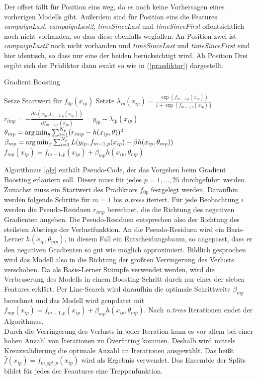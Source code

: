 Der offset fällt für Position eins weg, da es noch keine Vorhersagen eines vorherigen Modells gibt. Außerdem sind für Position eins die Features \textit{campaignLast}, \textit{campaignLast2}, \textit{timeSinceLast} und \textit{timeSinceFirst} offentsichtlich noch nicht vorhanden, so dass diese ebenfalls wegfallen. An Position zwei ist \textit{campaignLast2} noch nicht vorhanden und \textit{timeSinceLast} und \textit{timeSinceFirst} sind hier identisch, so dass nur eine der beiden berücksichtigt wird. Ab Position Drei ergibt sich der Prädiktor dann exakt so wie in (\ref{praediktor}) dargestellt.\\
\begin{algorithm}
\caption{Gradient Boosting}\label{alg}
\label{gradboosting}
\begin{algorithmic}
\STATE Setze Startwert für $f_{0p}(x_{ip})$
	\STATE Setzte $\lambda_{ip}(x_{ip}) = \frac{\exp(f_{m-1,p}(x_{ip}))}{1+\exp(f_{m-1,p}(x_{ip}))}$
		\STATE $r_{imp} = - \frac{\partial L(y_{ip},f_{m-1,p}(x_{ip}))}{\partial f_{m-1,p}(x_{ip})} = y_{ip} - \lambda_{ip}(x_{ip})$
	\ENDFOR
	\STATE $\theta_{mp} = \operatorname*{arg\,min}_{\theta} \sum_{i=1}^{N_p} (r_{imp} - h(x_{ip}, \theta))^2$
	\STATE $\beta_{mp} = \operatorname*{arg\,min}_{\beta} \sum_{i=1}^{N_p} L(y_{ip}, f_{m-1,p}(x_{ip}) + \beta h(x_{ip},\theta_{mp}))$
	\STATE $f_{mp}(x_{ip}) = f_{m-1,p}(x_{ip}) + \beta_{mp} h(x_{ip},\theta_{mp})$
\ENDFOR
\end{algorithmic}
\end{algorithm}
Algorithmus \ref{alg} enthält Pseudo-Code, der das Vorgehen beim Gradient Boosting erläutern soll. Dieser muss für jedes $p=1,...,25$ durchgeführt werden. Zunächst muss ein Startwert des Prädiktors $f_{0p}$ festgelegt werden. Daraufhin werden folgende Schritte für $m=1$ bis \textit{n.trees} iteriert. Für jede Beobachtung $i$ werden die Pseudo-Residuen $r_{imp}$ berechnet, die die Richtung des negativen Gradienten angeben. Die Pseudo-Residuen entsprechen also der Richtung des steilsten Abstiegs der Verlustfunktion. An die Pseudo-Residuen wird ein Basis-Lerner $h(x_{ip},\theta_{mp})$, in diesem Fall ein Entscheidungsbaum, so angepasst, dass er den negativen Gradienten so gut wie möglich approximiert. Bildlich gesprochen wird das Modell also in die Richtung der größten Verringerung des Verlusts verschoben. Da als Basis-Lerner Stümpfe verwendet werden, wird die Verbesserung des Modells in einem Boosting-Schritt durch nur eines der sieben Features erklärt. Per Line-Search wird daraufhin die optimale Schrittweite $\beta_{mp}$ berechnet und das Modell wird geupdatet mit $f_{mp}(x_{ip}) = f_{m-1,p}(x_{ip}) + \beta_{mp} h(x_{ip},\theta_{mp})$. Nach \textit{n.trees} Iterationen endet der Algorithmus.\\
Durch die Verringerung des Verlusts in jeder Iteration kann es vor allem bei einer hohen Anzahl von Iterationen zu Overfitting kommen. Deshalb wird mittels Kreuzvalidierung die optimale Anzahl an Iterationen ausgewählt. Das heißt $\hat{f}(x_{ip}) = f_{m\_opt,p}(x_{ip})$ wird als Ergebnis verwendet. Das Ensemble der Splits bildet für jedes der Feautures eine Treppenfunktion.

